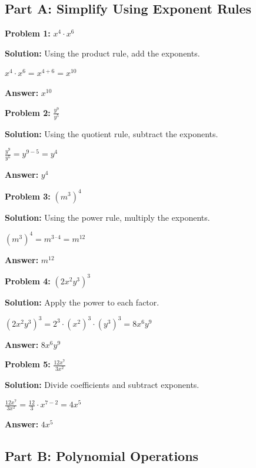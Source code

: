 \documentclass[12pt]{article}
\begin{document}
	\subsection*{Part A: Simplify Using Exponent Rules}

		\textbf{Problem 1:} $x^4 \cdot x^6$
		
		\textbf{Solution:} Using the product rule, add the exponents.
		
		$x^4 \cdot x^6 = x^{4+6} = x^{10}$
		
		\textbf{Answer:} $x^{10}$

		\vspace{0.5cm}

		\textbf{Problem 2:} $\frac{y^9}{y^5}$
		
		\textbf{Solution:} Using the quotient rule, subtract the exponents.
		
		$\frac{y^9}{y^5} = y^{9-5} = y^4$
		
		\textbf{Answer:} $y^4$

		\vspace{0.5cm}

		\textbf{Problem 3:} $(m^3)^4$
		
		\textbf{Solution:} Using the power rule, multiply the exponents.
		
		$(m^3)^4 = m^{3 \cdot 4} = m^{12}$
		
		\textbf{Answer:} $m^{12}$

		\vspace{0.5cm}

		\textbf{Problem 4:} $(2x^2y^3)^3$
		
		\textbf{Solution:} Apply the power to each factor.
		
		$(2x^2y^3)^3 = 2^3 \cdot (x^2)^3 \cdot (y^3)^3 = 8x^6y^9$
		
		\textbf{Answer:} $8x^6y^9$

		\vspace{0.5cm}

		\textbf{Problem 5:} $\frac{12x^7}{3x^2}$
		
		\textbf{Solution:} Divide coefficients and subtract exponents.
		
		$\frac{12x^7}{3x^2} = \frac{12}{3} \cdot x^{7-2} = 4x^5$
		
		\textbf{Answer:} $4x^5$

	\newpage

	\subsection*{Part B: Polynomial Operations}
\end{document}
